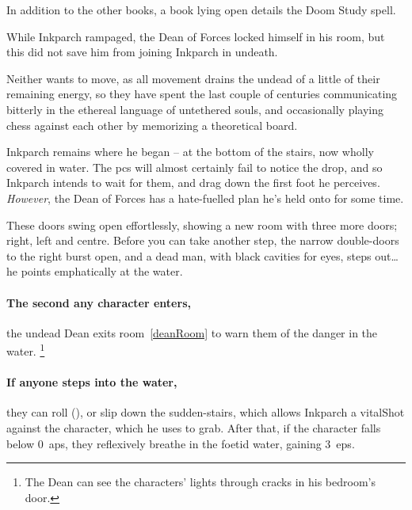 In addition to the other books, a book lying open details the Doom Study spell.

\doomStudySpell


\begin{exampletext}
  While Inkparch rampaged, the Dean of Forces locked himself in his room, but this did not save him from joining Inkparch in undeath.

  Neither wants to move, as all movement drains the undead of a little of their remaining energy, so they have spent the last couple of centuries communicating bitterly in the ethereal language of untethered souls, and occasionally playing chess against each other by memorizing a theoretical board.
\end{exampletext}

Inkparch remains where he began -- at the bottom of the stairs, now wholly covered in water.
The \glspl{pc} will almost certainly fail to notice the drop, and so Inkparch intends to wait for them, and drag down the first foot he perceives.
\emph{However}, the Dean of Forces has a hate-fuelled plan he's held onto for some time.

\begin{boxtext}
  These doors swing open effortlessly, showing a new room with three more doors; right, left and centre.
  Before you can take another step, the narrow double-doors to the right burst open, and a dead man, with black cavities for eyes, steps out\ldots
  he points emphatically at the water.
\end{boxtext}

\paragraph{The second any character enters,}
the undead Dean exits room~\ref{deanRoom} to warn them of the danger in the water.%
\footnote{The Dean can see the characters' lights through cracks in his bedroom's door.}

\paragraph{If anyone steps into the water,}
they can roll  (\tn[12]), or slip down the sudden-stairs, which allows Inkparch a \gls{vitalShot} against the character, which he uses to grab.%
After that, if the character falls below 0~\glspl{ap}, they reflexively breathe in the foetid water, gaining 3~\glspl{ep}.


